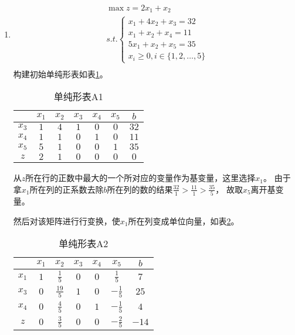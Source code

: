 \begin{solution}
   \begin{enumerate}
      \item 
      \begin{align*}
         &\max z = 2x_1 + x_2\\
         &s.t. \begin{cases}
            x_1 + 4x_2 + x_3 = 32\\
            x_1 + x_2 + x_4 = 11\\
            5x_1 + x_2 + x_5 = 35\\
            x_i \ge 0, i \in \{1,2,\ldots, 5\}
        \end{cases}\\
      \end{align*}
      构建初始单纯形表如表\ref{ta1}。
      \begin{table}[!h]
         \centering
         \caption{单纯形表A1}
         \label{ta1}
         \begin{tabular}{c|cccccc} 
         \toprule
                &$x_1$  &$x_2$  &$x_3$  &$x_4$  &$x_5$  &$b$   \\\hline
         $x_3$  &$1$    &$4$    &$1$    &$0$    &$0$    &$32$   \\
         $x_4$  &$1$    &$1$    &$0$    &$1$    &$0$    &$11$   \\
         $x_5$  &$5$    &$1$    &$0$    &$0$    &$1$    &$35$   \\
         $z$    &$2$    &$1$    &$0$    &$0$    &$0$    &$0$   \\
         \bottomrule
         \end{tabular}
      \end{table}

      从$z$所在行的正数中最大的一个所对应的变量作为基变量，这里选择$x_1$。
      由于拿$x_1$所在列的正系数去除$b$所在列的数的结果$\frac{32}{1}>\frac{11}{1}>\frac{35}{5}$，
      故取$x_{5}$离开基变量。

      然后对该矩阵进行行变换，使$x_1$所在列变成单位向量，如表\ref{ta2}。
      
      \begin{table}[!h]
         \centering
         \caption{单纯形表A2}
         \label{ta2}
         \begin{tabular}{c|cccccc} 
         \toprule
                &$x_1$  &$x_2$  &$x_3$  &$x_4$  &$x_5$  &$b$   \\\hline
         $x_1$  &$1$    &$\frac{1}{5}$    &$0$    &$0$    &$\frac{1}{5}$    &$7$   \\
         $x_3$  &$0$    &$\frac{19}{5}$    &$1$    &$0$    &$-\frac{1}{5}$    &$25$   \\
         $x_4$  &$0$    &$\frac{4}{5}$     &$0$    &$1$    &$-\frac{1}{5}$    &$4$   \\
         $z$    &$0$    &$\frac{3}{5}$    &$0$    &$0$    &$-\frac{2}{5}$    &$-14$   \\
         \bottomrule
         \end{tabular}
      \end{table}


\end{enumerate}
\end{solution}
